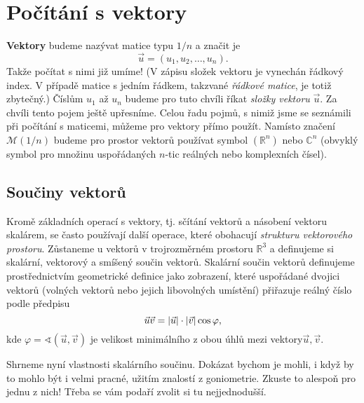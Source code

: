   \section{Počítání s vektory}\label{mai:IchapIIsecIV}
    \textbf{Vektory} budeme nazývat matice typu \(1/n\) a značit je
    \begin{equation*}
      \vec{u} = (u_1, u_2, \ldots, u_n).
    \end{equation*}
    Takže počítat s nimi již umíme! (V zápisu složek vektoru je vynechán řádkový index. V případě 
    matice s jedním řádkem, takzvané \emph{řádkové matice}, je totiž zbytečný.) Číslům \(u_1\) až 
    \(u_n\) budeme pro tuto chvíli říkat \emph{složky vektoru} \(\vec{u}\). Za chvíli tento pojem 
    ještě upřesníme. Celou řadu pojmů, s nimiž jsme se seznámili při počítání s maticemi, můžeme 
    pro vektory přímo použít. Namísto značení \(\mathcal{M} (1/n)\) budeme pro prostor vektorů 
    používat symbol \((\mathbb{R}^n)\) nebo \(\mathbb{C}^n\) (obvyklý symbol pro množinu 
    uspořádaných \(n\)-tic reálných nebo komplexních čísel).
    
    \subsection{Součiny vektorů}
      Kromě základních operací s vektory, tj. sčítání vektorů a násobení vektoru skalárem, se 
      často používají další operace, které obohacují \emph{strukturu vektorového prostoru}. 
      Zůstaneme u vektorů v trojrozměrném prostoru \(\mathbb{R}^3\) a definujeme si skalární, 
      vektorový a smíšený součin vektorů. Skalární součin vektorů definujeme prostřednictvím 
      geometrické definice jako zobrazení, které uspořádané dvojici vektorů (volných vektorů nebo 
      jejich libovolných umístění) přiřazuje reálný číslo podle předpisu
      \begin{equation}\label{mai:eq038}
        \vec{u}\vec{v} = \lvert\vec{u}\rvert\cdot\lvert\vec{v}\rvert\cos\varphi,
      \end{equation}
      kde \(\varphi = \sphericalangle(\vec{u},\vec{v})\) je velikost minimálního z obou úhlů mezi 
      vektory\(\vec{u},\vec{v}\).

    
    
    Shrneme nyní vlastnosti skalárního součinu. Dokázat bychom je mohli, i když by to mohlo být i 
    velmi pracné, užitím znalostí z goniometrie. Zkuste to alespoň pro jednu z nich! Třeba se    
    vám podaří zvolit si tu nejjednodušší.

\printbibliography[title={Seznam literatury}, heading=subbibliography]

